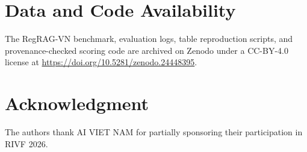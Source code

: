 \documentclass[conference,a4paper]{IEEEtran}
\begin{document}
\section*{Data and Code Availability}
The RegRAG-VN benchmark, evaluation logs, table reproduction scripts, and provenance-checked scoring code are archived on Zenodo under a CC-BY-4.0 license at \url{https://doi.org/10.5281/zenodo.24448395}.

\section*{Acknowledgment}
The authors thank AI VIET NAM for partially sponsoring their participation in RIVF 2026.



\end{document}
